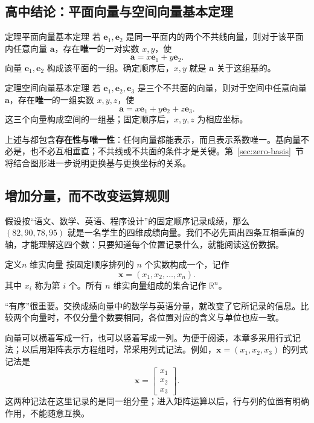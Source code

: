 \documentclass[a4paper,12pt,twoside,openany,fontset=none]{ctexbook}
\newcounter{theorem}[chapter]
\newenvironment{theorem}[1][]{\begin{thmBox}{定理}{#1}}{\end{thmBox}}
\newcounter{definition}[chapter]
\newenvironment{definition}[1][]{\begin{defBox}{定义}{#1}}{\end{defBox}}
\numberwithin{equation}{chapter}
\begin{document}
\subsection*{高中结论：平面向量与空间向量基本定理}

\begin{theorem}[平面向量基本定理]
若 $\boldsymbol{e}_1,\boldsymbol{e}_2$ 是同一平面内的两个不共线向量，则对于该平面内任意向量 $\boldsymbol{a}$，存在\textbf{唯一}的一对实数 $x,y$，使
\[
    \boldsymbol{a}=x\boldsymbol{e}_1+y\boldsymbol{e}_2.
\]
向量 $\boldsymbol{e}_1,\boldsymbol{e}_2$ 构成该平面的一组。确定顺序后，$x,y$ 就是 $\boldsymbol{a}$ 关于这组基的。
\end{theorem}

\begin{theorem}[空间向量基本定理]
若 $\boldsymbol{e}_1,\boldsymbol{e}_2,\boldsymbol{e}_3$ 是三个不共面的向量，则对于空间中任意向量 $\boldsymbol{a}$，存在\textbf{唯一}的一组实数 $x,y,z$，使
\[
    \boldsymbol{a}=x\boldsymbol{e}_1+y\boldsymbol{e}_2+z\boldsymbol{e}_3.
\]
这三个向量构成空间的一组基；固定顺序后，$x,y,z$ 为相应坐标。
\end{theorem}

上述与都包含\textbf{存在性与唯一性}：任何向量都能表示，而且表示系数唯一。基向量不必是，也不必互相垂直；不共线或不共面的条件才是关键。第~\ref{sec:zero-basis}~节将结合图形进一步说明更换基与更换坐标的关系。

\subsection*{增加分量，而不改变运算规则}

假设按“语文、数学、英语、程序设计”的固定顺序记录成绩，那么 $(82,90,78,95)$ 就是一名学生的四维成绩向量。我们不必先画出四条互相垂直的轴，才能理解这四个数：只要知道每个位置记录什么，就能阅读这份数据。

\begin{definition}[$n$ 维实向量]
按固定顺序排列的 $n$ 个实数构成一个，记作
\[
    \boldsymbol{x}=(x_1,x_2,\ldots,x_n).
\]
其中 $x_i$ 称为第 $i$ 个。所有 $n$ 维实向量组成的集合记作 $\mathbb{R}^n$。
\end{definition}

“有序”很重要。交换成绩向量中的数学与英语分量，就改变了它所记录的信息。比较两个向量时，不仅分量个数要相同，各位置对应的含义与单位也应一致。

向量可以横着写成一行，也可以竖着写成一列。为便于阅读，本章多采用行式记法；以后用矩阵表示方程组时，常采用列式记法。例如，$\boldsymbol{x}=(x_1,x_2,x_3)$ 的列式记法是
\[
    \boldsymbol{x}=\left[\begin{array}{c}x_1\\x_2\\x_3\end{array}\right].
\]
这两种记法在这里记录的是同一组分量；进入矩阵运算以后，行与列的位置有明确作用，不能随意互换。
\end{document}
